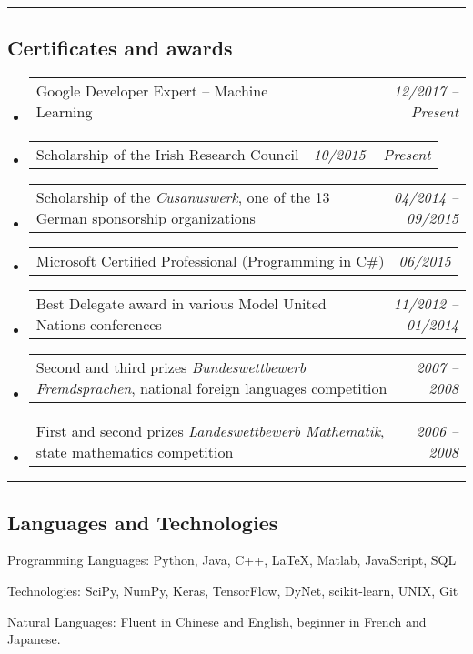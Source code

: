 \documentclass[10pt,letterpaper]{article}
\makeatletter
\newenvironment{indentsection}[1]%
{\begin{list}{}%
	{\setlength{\leftmargin}{#1}}%
	\item[]%
}
{\end{list}}
\newcommand{\headerrow}[2]
{\begin{tabular*}{\linewidth}{l@{\extracolsep{\fill}}r}
	#1 &
	#2 \\
\end{tabular*}}
\makeatother
\begin{document}
\hrule
\vspace{-0.4em}
\subsection*{Certificates and awards}

\begin{itemize}
	\parskip=0.1em
	
	\item 
	\headerrow
		{Google Developer Expert -- Machine Learning}
		{\emph{12/2017 -- Present}}
	\item 
	\headerrow
		{Scholarship of the Irish Research Council}
		{\emph{10/2015 -- Present}}
	\item 
	\headerrow
		{Scholarship of the \emph{Cusanuswerk}, one of the 13 German sponsorship organizations}
		{\emph{04/2014 -- 09/2015}}	
	\item 
	\headerrow
		{Microsoft Certified Professional (Programming in C\#)}
		{\emph{06/2015}}
	\item 
	\headerrow
		{Best Delegate award in various Model United Nations conferences}
		{\emph{11/2012 -- 01/2014}}
	\item 
	\headerrow
		{Second and third prizes \emph{Bundeswettbewerb Fremdsprachen}, national foreign languages competition}
		{\emph{2007 -- 2008}}
	\item 
	\headerrow
		{First and second prizes \emph{Landeswettbewerb Mathematik}, state mathematics competition}
		{\emph{2006 -- 2008}}
	

\end{itemize}

\hrule
\vspace{-0.4em}
\subsection*{Languages and Technologies}

\begin{indentsection}{\parindent}
\begin{description*}
	\item[Programming Languages:]
	Python, Java, C++, \LaTeX, Matlab, JavaScript, SQL
	\item[Technologies:]
	SciPy, NumPy, Keras, TensorFlow, DyNet, scikit-learn, UNIX, Git
	\item[Natural Languages:]
	Fluent in Chinese and English, beginner in French and Japanese.
\end{description*}
\end{indentsection}
\end{document}
